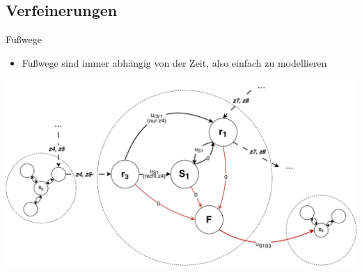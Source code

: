 \subsection{Verfeinerungen}
\begin{frame}{Fußwege}
	\begin{itemize}
		\item Fußwege sind immer abhängig von der Zeit, also einfach zu modellieren
	\end{itemize}

	\begin{center}
		\includegraphics[width=.90\linewidth]{images/time-dependent/model_3.pdf}
	\end{center}
\end{frame}


















